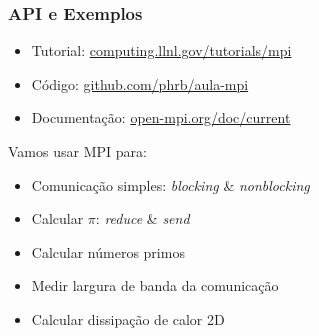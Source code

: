 \documentclass[12pt, compress]{beamer}
\begin{document}
\begin{frame}
    \frametitle{API e Exemplos}
    \begin{itemize}
        \item \alert{Tutorial}: \url{computing.llnl.gov/tutorials/mpi}
        \item \alert{Código}: \url{github.com/phrb/aula-mpi}
        \item \alert{Documentação}: \url{open-mpi.org/doc/current}
    \end{itemize}

    Vamos usar MPI para:

    \begin{itemize}
        \item Comunicação simples: \textit{blocking} \& \textit{nonblocking}
        \item Calcular $\pi$: \textit{reduce} \& \textit{send}
        \item Calcular números primos
        \item Medir largura de banda da comunicação
        \item Calcular dissipação de calor 2D
    \end{itemize}
\end{frame}

\maketitle
\end{document}
